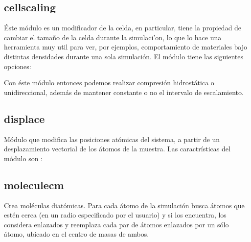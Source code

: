 \subsection{cellscaling}
\'Este m\'odulo es un modificador de la celda, en particular, tiene la propiedad
de cambiar el tama\~no de la celda durante la simulaci'on, lo que lo hace una
herramienta muy util para ver, por ejemplos, comportamiento de materiales bajo
distintas densidades durante una sola simulaci\'on. El m\'odulo tiene las
siguientes opciones:


Con \'este m\'odulo entonces podemos realizar compresi\'on hidrost\'atica o
unidireccional, adem\'as de mantener constante o no el intervalo de
escalamiento.

\subsection{displace}
M\'odulo que modifica las posiciones at\'omicas del sistema, a partir de un
desplazamiento vectorial de los \'atomos de la muestra. Las caractr\'isticas del
m\'odulo son :


\subsection{moleculecm}
Crea mol\'eculas diat\'omicas. Para cada \'atomo de la simulaci\'on busca
\'atomos que est\'en cerca (en un radio especificado por el usuario) y si los
encuentra, los considera enlazados y reemplaza cada par de \'atomos enlazados
por un s\'olo \'atomo, ubicado en el centro de masas de ambos.


